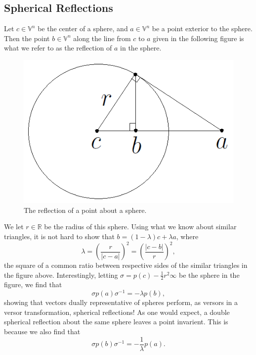 \documentclass[12pt]{article}
\newcommand{\V}{\mathbb{V}}
\newcommand{\R}{\mathbb{R}}
\newcommand{\nvai}{\infty}
\begin{document}

\subsection{Spherical Reflections}\label{sec_spherical_reflections}

Let $c\in\V^n$ be the center of a sphere, and $a\in\V^n$ be a point
exterior to the sphere.  Then the point $b\in\V^n$ along the line
from $c$ to $a$ given in the following figure is what we refer to
as the reflection of $a$ in the sphere.
\begin{figure}[H]\label{fig_spherical_reflection}
\centering
\includegraphics[scale=0.3]{SphericalReflectionFigure}
\caption{The reflection of a point about a sphere.}
\end{figure}
We let $r\in\R$ be the radius of this sphere.  Using what we know about similar
triangles, it is not hard to show that $b = (1-\lambda)c + \lambda a$,
where
\begin{equation*}
\lambda = \left(\frac{r}{|c-a|}\right)^2 = \left(\frac{|c-b|}{r}\right)^2,
\end{equation*}
the square of a common ratio between respective sides of the
similar triangles in the figure above.
Interestingly, letting $\sigma=p(c)-\frac{1}{2}r^2\nvai$ be the sphere in the figure, we find that
\begin{equation*}
\sigma p(a)\sigma^{-1} = -\lambda p(b),
\end{equation*}
showing that vectors dually
representative of spheres perform, as versors in a versor transformation, spherical reflections!
As one would expect, a double spherical reflection about the same sphere leaves a point
invarient.  This is because we also find that
\begin{equation*}
\sigma p(b)\sigma^{-1} = -\frac{1}{\lambda}p(a).
\end{equation*}
\end{document}
